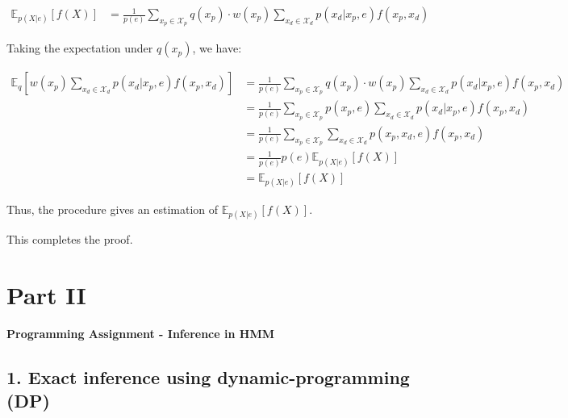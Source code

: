 \documentclass[a4 paper]{article}
\begin{document}
\begin{enumerate}
\begin{align*}
\mathbb{E}_{p(X|e)}[f(X)] &= \frac{1}{p(e)} \sum_{x_p \in \mathcal{X}_p} q(x_p) \cdot w(x_p) \sum_{x_d \in \mathcal{X}_d} p(x_d | x_p, e) f(x_p, x_d)
\end{align*}

Taking the expectation under \( q(x_p) \), we have:

\begin{align*}
\mathbb{E}_q \left[ w(x_p) \sum_{x_d \in \mathcal{X}_d} p(x_d | x_p, e) f(x_p, x_d) \right] &= \frac{1}{p(e)} \sum_{x_p \in \mathcal{X}_p} q(x_p) \cdot w(x_p) \sum_{x_d \in \mathcal{X}_d} p(x_d | x_p, e) f(x_p, x_d) \\
&= \frac{1}{p(e)} \sum_{x_p \in \mathcal{X}_p} p(x_p, e) \sum_{x_d \in \mathcal{X}_d} p(x_d | x_p, e) f(x_p, x_d) \\
&= \frac{1}{p(e)} \sum_{x_p \in \mathcal{X}_p} \sum_{x_d \in \mathcal{X}_d} p(x_p, x_d, e) f(x_p, x_d) \\
&= \frac{1}{p(e)} p(e) \mathbb{E}_{p(X|e)}[f(X)] \\
&= \mathbb{E}_{p(X|e)}[f(X)]
\end{align*}

Thus, the procedure gives an estimation of \( \mathbb{E}_{p(X|e)}[f(X)] \).

This completes the proof.





\end{enumerate}



















\newpage
\section*{Part II}
\textbf{Programming Assignment - Inference in HMM}


\subsection*{1. Exact inference using dynamic-programming (DP)}
\end{document}
